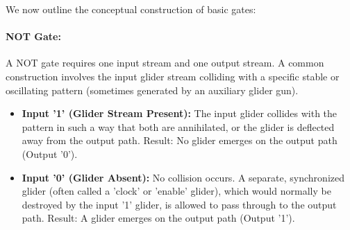 \documentclass{article}
\theoremstyle{definition}
\theoremstyle{plain}
\theoremstyle{plain}
\begin{document}
We now outline the conceptual construction of basic gates:

\paragraph{NOT Gate:} A NOT gate requires one input stream and one output stream. A common construction involves the input glider stream colliding with a specific stable or oscillating pattern (sometimes generated by an auxiliary glider gun).
\begin{itemize}
  \item \textbf{Input '1' (Glider Stream Present):} The input glider collides with the pattern in such a way that both are annihilated, or the glider is deflected away from the output path. Result: No glider emerges on the output path (Output '0').
  \item \textbf{Input '0' (Glider Absent):} No collision occurs. A separate, synchronized glider (often called a 'clock' or 'enable' glider), which would normally be destroyed by the input '1' glider, is allowed to pass through to the output path. Result: A glider emerges on the output path (Output '1').
\end{itemize}
\end{document}

